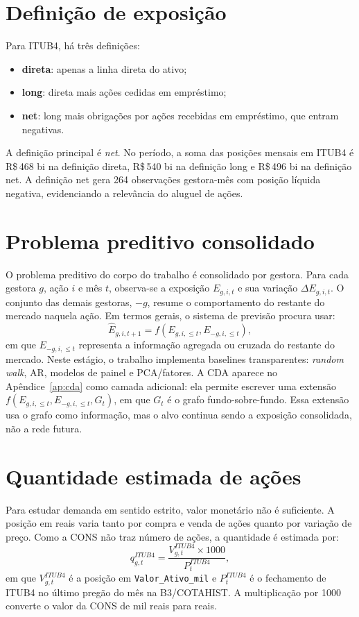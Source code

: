 \documentclass[12pt,a4paper]{report}
\begin{document}
\section{Definição de exposição}

Para ITUB4, há três definições:
\begin{itemize}
\item \textbf{direta}: apenas a linha direta do ativo;
\item \textbf{long}: direta mais ações cedidas em empréstimo;
\item \textbf{net}: long mais obrigações por ações recebidas em empréstimo, que entram negativas.
\end{itemize}

A definição principal é \emph{net}. No período, a soma das posições mensais em ITUB4 é R\$\,468 bi na
definição direta, R\$\,540 bi na definição long e R\$\,496 bi na definição net. A definição net gera 264
observações gestora-mês com posição líquida negativa, evidenciando a relevância do aluguel de ações.

\section{Problema preditivo consolidado}

O problema preditivo do corpo do trabalho é consolidado por gestora. Para cada gestora $g$, ação $i$ e mês
$t$, observa-se a exposição $E_{g,i,t}$ e sua variação $\Delta E_{g,i,t}$. O conjunto das demais gestoras,
$-g$, resume o comportamento do restante do mercado naquela ação. Em termos gerais, o sistema de previsão
procura usar:
\[
\widehat{E}_{g,i,t+1}
= f(E_{g,i,\leq t}, E_{-g,i,\leq t}),
\]
em que $E_{-g,i,\leq t}$ representa a informação agregada ou cruzada do restante do mercado. Neste estágio,
o trabalho implementa baselines transparentes: \emph{random walk}, AR, modelos de painel e PCA/fatores. A
CDA aparece no Apêndice~\ref{ap:cda} como camada adicional: ela permite escrever uma extensão
$f(E_{g,i,\leq t}, E_{-g,i,\leq t}, G_t)$, em que $G_t$ é o grafo fundo-sobre-fundo. Essa extensão usa o
grafo como informação, mas o alvo continua sendo a exposição consolidada, não a rede futura.

\section{Quantidade estimada de ações}

Para estudar demanda em sentido estrito, valor monetário não é suficiente. A posição em reais varia tanto por
compra e venda de ações quanto por variação de preço. Como a CONS não traz número de ações, a quantidade é
estimada por:
\[
q_{g,t}^{ITUB4} =
\frac{V_{g,t}^{ITUB4}\times 1000}{P_t^{ITUB4}},
\]
em que $V_{g,t}^{ITUB4}$ é a posição em \texttt{Valor\_Ativo\_mil} e $P_t^{ITUB4}$ é o fechamento de ITUB4
no último pregão do mês na B3/COTAHIST. A multiplicação por 1000 converte o valor da CONS de mil reais para
reais.
\end{document}
